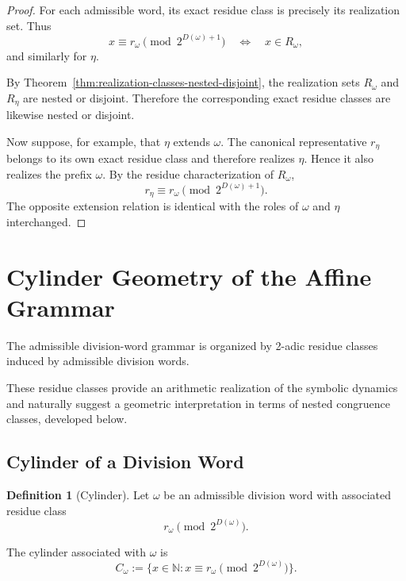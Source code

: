 \documentclass[12pt, oneside]{article}
\numberwithin{equation}{section}
\theoremstyle{definition}
\newtheorem{definition}{Definition}[section]
\theoremstyle{plain}
\theoremstyle{remark}
\begin{document}
\begin{proof}
For each admissible word, its exact residue class is precisely its
realization set. Thus
\[
x\equiv r_\omega \pmod{2^{D(\omega)+1}} \quad\Longleftrightarrow\quad x\in R_\omega,
\]
and similarly for \(\eta\).

By Theorem~\ref{thm:realization-classes-nested-disjoint}, the realization
sets \(R_\omega\) and \(R_\eta\) are nested or disjoint. Therefore the
corresponding exact residue classes are likewise nested or disjoint.

Now suppose, for example, that \(\eta\) extends \(\omega\). The canonical
representative \(r_\eta\) belongs to its own exact residue class and
therefore realizes \(\eta\). Hence it also realizes the prefix \(\omega\).
By the residue characterization of \(R_\omega\),
\[
r_\eta\equiv r_\omega
\pmod{2^{D(\omega)+1}}.
\]
The opposite extension relation is identical with the roles of
\(\omega\) and \(\eta\) interchanged.
\end{proof}


\section{Cylinder Geometry of the Affine Grammar}
\label{sec:cylinder-geometry}

The admissible division-word grammar is organized by
2-adic residue classes induced by admissible division words.

These residue classes provide an arithmetic realization of the
symbolic dynamics and naturally suggest a geometric interpretation
in terms of nested congruence classes, developed below.

\subsection{Cylinder of a Division Word}

\begin{definition}[Cylinder]
Let $\omega$ be an admissible division word with associated residue
class
\[
r_\omega \pmod{2^{D(\omega)}}.
\]

The cylinder associated with $\omega$ is
\[
C_\omega := \{x \in \mathbb N : x \equiv r_\omega \pmod{2^{D(\omega)}}\}.
\]
\end{definition}
\end{document}

